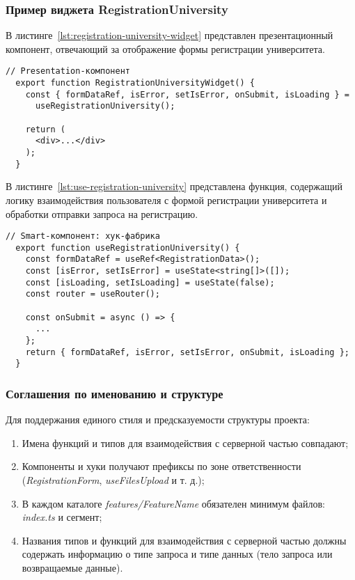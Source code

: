 \subsubsection{Пример виджета RegistrationUniversity}

В листинге~\ref{lst:registration-university-widget} представлен презентационный компонент, отвечающий за отображение формы регистрации университета.

\begin{lstlisting}[breaklines=true,caption=RegistrationUniversityWidget,label=lst:registration-university-widget]
  // Presentation-компонент
  export function RegistrationUniversityWidget() {
    const { formDataRef, isError, setIsError, onSubmit, isLoading } =
      useRegistrationUniversity();

    return (
      <div>...</div>
    );
  }
\end{lstlisting}

В листинге~\ref{lst:use-registration-university} представлена функция, содержащий логику взаимодействия пользователя с формой регистрации университета и обработки отправки запроса на регистрацию.

\begin{lstlisting}[breaklines=true,caption=useRegistrationUniversity,label=lst:use-registration-university]
  // Smart-компонент: хук-фабрика
  export function useRegistrationUniversity() {
    const formDataRef = useRef<RegistrationData>();
    const [isError, setIsError] = useState<string[]>([]);
    const [isLoading, setIsLoading] = useState(false);
    const router = useRouter();

    const onSubmit = async () => {
      ...
    };
    return { formDataRef, isError, setIsError, onSubmit, isLoading };
  }
\end{lstlisting}

\subsubsection{Соглашения по именованию и структуре}

Для поддержания единого стиля и предсказуемости структуры проекта:
\begin{enumerate}
  \item Имена функций и типов для взаимодействия с серверной частью совпадают;
  \item Компоненты и хуки получают префиксы по зоне ответственности (\textit{RegistrationForm}, \textit{useFilesUpload} и т. д.);
  \item В каждом каталоге \textit{features/FeatureName} обязателен минимум файлов: \textit{index.ts} и сегмент;
  \item Названия типов и функций для взаимодействия с серверной частью должны содержать информацию о типе запроса и типе данных (тело запроса или возвращаемые данные).
\end{enumerate}
